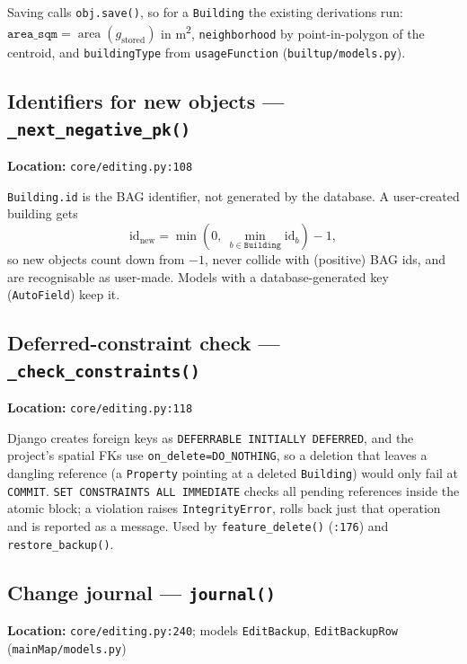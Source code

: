 \documentclass[11pt]{article}
\newcommand{\code}[1]{\texttt{#1}}
\begin{document}
Saving calls \code{obj.save()}, so for a \code{Building} the existing derivations run: $\texttt{area\_sqm} = \operatorname{area}(g_{\text{stored}})$ in \si{m^2}, \code{neighborhood} by point-in-polygon of the centroid, and \code{buildingType} from \code{usageFunction} (\code{builtup/models.py}).

\subsection{Identifiers for new objects --- \code{\_next\_negative\_pk()}}
\textbf{Location:} \code{core/editing.py:108}

\code{Building.id} is the BAG identifier, not generated by the database. A user-created building gets
\begin{equation}
  \mathrm{id}_{\text{new}} = \min\!\left(0,\ \min_{b \in \texttt{Building}} \mathrm{id}_b\right) - 1,
\end{equation}
so new objects count down from $-1$, never collide with (positive) BAG ids, and are recognisable as user-made. Models with a database-generated key (\code{AutoField}) keep it.

\subsection{Deferred-constraint check --- \code{\_check\_constraints()}}
\textbf{Location:} \code{core/editing.py:118}

Django creates foreign keys as \code{DEFERRABLE INITIALLY DEFERRED}, and the project's spatial FKs use \code{on\_delete=DO\_NOTHING}, so a deletion that leaves a dangling reference (a \code{Property} pointing at a deleted \code{Building}) would only fail at \code{COMMIT}. \code{SET CONSTRAINTS ALL IMMEDIATE} checks all pending references inside the atomic block; a violation raises \code{IntegrityError}, rolls back just that operation and is reported as a message. Used by \code{feature\_delete()} (\code{:176}) and \code{restore\_backup()}.

\subsection{Change journal --- \code{journal()}}
\textbf{Location:} \code{core/editing.py:240}; models \code{EditBackup}, \code{EditBackupRow} (\code{mainMap/models.py})
\end{document}
